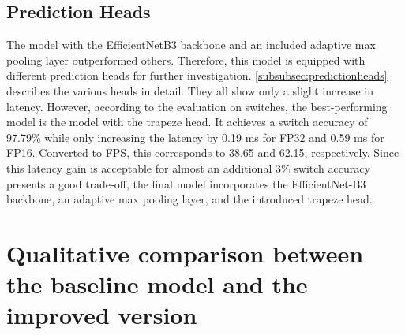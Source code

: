 \subsection{Prediction Heads}

\begin{table}[H]
    \centering
    \caption{Prediction Heads Results}
    \label{tab:predHeadsResults}
\end{table}

The model with the EfficientNetB3 backbone and an included adaptive max pooling layer outperformed others.
Therefore, this model is equipped with different prediction heads for further investigation.
\autoref{subsubsec:predictionheads} describes the various heads in detail.
They all show only a slight increase in latency.
However, according to the evaluation on switches, the best-performing model is the model with the trapeze head.
It achieves a switch accuracy of 97.79\% while only increasing the latency by 0.19 ms for FP32 and 0.59 ms for FP16.
Converted to \ac{FPS}, this corresponds to 38.65 and 62.15, respectively.
Since this latency gain is acceptable for almost an additional 3\% switch accuracy presents a good trade-off, the final model incorporates the EfficientNet-B3 backbone, an adaptive max pooling layer, and the introduced trapeze head.

\section{Qualitative comparison between the baseline model and the improved version}
\label{sec:qualitativeComparison}

